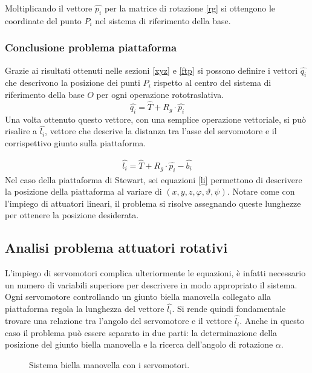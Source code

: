 \documentclass[11pt]{article}
\begin{document}
Moltiplicando il vettore $\hat{p_i}$ per la matrice di rotazione \eqref{rg} si ottengono le coordinate del punto $P_i$ nel sistema di riferimento della base. 

\subsubsection{Conclusione problema piattaforma}
Grazie ai risultati ottenuti nelle sezioni \ref{xyz} e \ref{ftp} si possono definire i vettori $\hat{q_i}$ che descrivono la posizione dei punti $P_i$ rispetto al centro del sistema di riferimento della base $O$ per ogni operazione rototraslativa.
\begin{equation}\label{qi}
\hat{q_i}=\hat{T}+R_g\cdot \hat{p_i}
\end{equation}
Una volta ottenuto questo vettore, con una semplice operazione vettoriale, si può risalire a $\hat{l_i}$, vettore che descrive la distanza tra l'asse del servomotore e il corrispettivo giunto sulla piattaforma.

\begin{align}\label{li}
\hat{l_i}=\hat{T}+R_g\cdot \hat{p_i}-\hat{b_i}
\end{align}
Nel caso della piattaforma di Stewart, sei equazioni \eqref{li} permettono di descrivere la posizione della piattaforma al variare di $(x,y,z,\varphi,\vartheta,\psi)$.
Notare come con l'impiego di attuatori lineari, il problema si risolve assegnando queste lunghezze per ottenere la posizione desiderata. 

\subsection{Analisi problema attuatori rotativi}
L'impiego di servomotori complica ulteriormente le equazioni, è infatti necessario un numero di variabili superiore per descrivere in modo appropriato il sistema. Ogni servomotore controllando un giunto biella manovella collegato alla piattaforma regola la lunghezza del vettore $\hat{l_i}$. Si rende quindi fondamentale trovare una relazione tra l'angolo del servomotore e il vettore $\hat{l_i}$. Anche in questo caso il problema può essere separato in due parti: la determinazione della posizione del giunto biella manovella e la ricerca dell'angolo di rotazione $\alpha$.

\begin{figure}[h!]
\centering
{}
\caption{Sistema biella manovella con i servomotori.} \label{fig:rv}
\end{figure}
\end{document}
